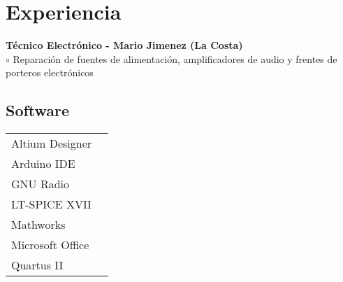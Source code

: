 \documentclass[a4paper,10pt]{article}
\begin{document}
\begin{adjustbox}{valign=t}
\begin{minipage}{0.60\textwidth}
\section*{Experiencia}
\begin{description}
\raggedright

\item[ \textcolor{ColorOne}{2015-2019}] 
	\textbf{Técnico Electrónico - Mario Jimenez (La Costa)}\\ \Myskip
	\textcolor{ColorOne}{$\circ$} 	Reparación de fuentes de alimentación, amplificadores de audio y frentes de porteros electrónicos \\	 	
\end{description}
\begin{multicols}{2}
\section*{Software}
\begin{tabular}{ll}
	Altium Designer     & \\
	Arduino IDE 		& \\
	GNU Radio 	        & \\
	LT-SPICE XVII    	& \\
	Mathworks 	        & \\
	Microsoft Office 	& \\
	Quartus II        	& \\
\end{tabular}
\vfill\null \columnbreak 

\end{multicols}
\end{minipage}
\end{adjustbox}
\end{document}
